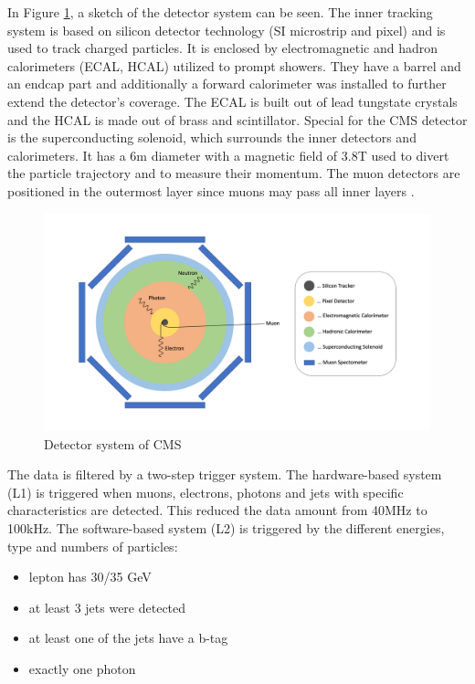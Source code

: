 \documentclass[11pt]{scrartcl}
\begin{document}
	In Figure \ref{fig:detectorsystem}, a sketch of the detector system can be seen. The inner tracking system is based on silicon detector technology (SI microstrip and pixel) and is used to track charged particles. It is enclosed by electromagnetic and hadron calorimeters (ECAL, HCAL) utilized to prompt showers. They have a barrel and an endcap part and additionally a forward calorimeter was installed to further extend the detector's coverage. The ECAL is built out of lead tungstate crystals and the HCAL is made out of brass and scintillator. Special for the CMS detector is the superconducting solenoid, which surrounds the inner detectors and calorimeters. It has a 6m diameter with a magnetic field of 3.8T used to divert the particle trajectory and to measure their momentum. The muon detectors are positioned in the outermost layer since muons may pass all inner layers \cite{TTG, CMS21, CMS08}.
	
	\begin{figure}[H]
	\centering
	\includegraphics[width=1\textwidth]{figures/detector_system.png}
	\caption{Detector system of CMS}
	\label{fig:detectorsystem}
	\end{figure}
	
	The data is filtered by a two-step trigger system. The hardware-based system (L1) is triggered when muons, electrons, photons and jets with specific characteristics are detected. This reduced the data amount from 40MHz to 100kHz. The software-based system (L2) is triggered by the different energies, type and numbers of particles:
	
\begin{itemize}
  \item lepton has 30/35 GeV
  \item at least 3 jets were detected
  \item at least one of the jets have a b-tag
  \item exactly one photon
\end{itemize}
\end{document}
